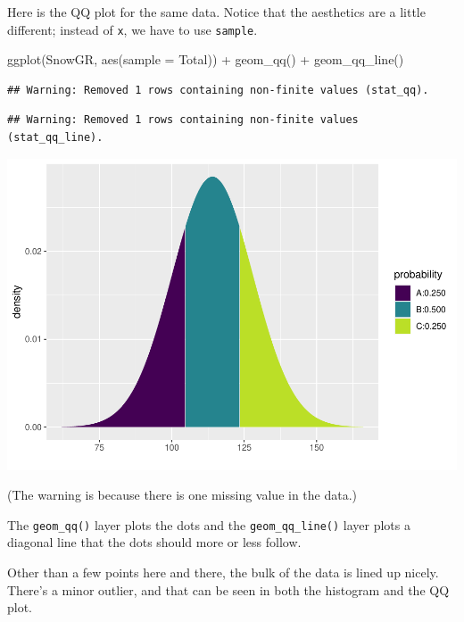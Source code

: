 \documentclass[
]{book}
\newenvironment{Shaded}{\begin{snugshade}}{\end{snugshade}}
\newcommand{\AttributeTok}[1]{\textcolor[rgb]{0.77,0.63,0.00}{#1}}
\newcommand{\FunctionTok}[1]{\textcolor[rgb]{0.00,0.00,0.00}{#1}}
\newcommand{\NormalTok}[1]{#1}
\newcommand{\SpecialCharTok}[1]{\textcolor[rgb]{0.00,0.00,0.00}{#1}}
\begin{document}
Here is the QQ plot for the same data. Notice that the aesthetics are a little different; instead of \texttt{x}, we have to use \texttt{sample}.

\begin{Shaded}
\begin{Highlighting}[]
\FunctionTok{ggplot}\NormalTok{(SnowGR, }\FunctionTok{aes}\NormalTok{(}\AttributeTok{sample =}\NormalTok{ Total)) }\SpecialCharTok{+}
    \FunctionTok{geom\_qq}\NormalTok{() }\SpecialCharTok{+}
    \FunctionTok{geom\_qq\_line}\NormalTok{()}
\end{Highlighting}
\end{Shaded}

\begin{verbatim}
## Warning: Removed 1 rows containing non-finite values (stat_qq).
\end{verbatim}

\begin{verbatim}
## Warning: Removed 1 rows containing non-finite values (stat_qq_line).
\end{verbatim}

\includegraphics{intro_stats_files/figure-latex/unnamed-chunk-359-1.pdf}

(The warning is because there is one missing value in the data.)

The \texttt{geom\_qq()} layer plots the dots and the \texttt{geom\_qq\_line()} layer plots a diagonal line that the dots should more or less follow.

Other than a few points here and there, the bulk of the data is lined up nicely. There's a minor outlier, and that can be seen in both the histogram and the QQ plot.
\end{document}

